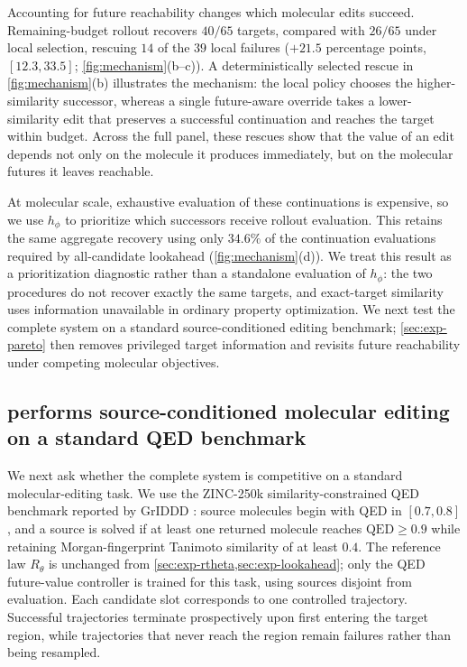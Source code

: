 Accounting for future reachability changes which molecular edits succeed. Remaining-budget rollout recovers $40/65$ targets, compared with $26/65$ under local selection, rescuing $14$ of the $39$ local failures ($+21.5$ percentage points, $[12.3,33.5]$; \cref{fig:mechanism}(b--c)). A deterministically selected rescue in \cref{fig:mechanism}(b) illustrates the mechanism: the local policy chooses the higher-similarity successor, whereas a single future-aware override takes a lower-similarity edit that preserves a successful continuation and reaches the target within budget. Across the full panel, these rescues show that the value of an edit depends not only on the molecule it produces immediately, but on the molecular futures it leaves reachable.

At molecular scale, exhaustive evaluation of these continuations is expensive, so we use $h_\phi$ to prioritize which successors receive rollout evaluation. This retains the same aggregate recovery using only $34.6\%$ of the continuation evaluations required by all-candidate lookahead (\cref{fig:mechanism}(d)). We treat this result as a prioritization diagnostic rather than a standalone evaluation of $h_\phi$: the two procedures do not recover exactly the same targets, and exact-target similarity uses information unavailable in ordinary property optimization. We next test the complete system on a standard source-conditioned editing benchmark; \cref{sec:exp-pareto} then removes privileged target information and revisits future reachability under competing molecular objectives.

\subsection{\method{} performs source-conditioned molecular editing on a standard QED benchmark}
\label{sec:exp-jin}

We next ask whether the complete \method{} system is competitive on a standard molecular-editing task. We use the ZINC-250k similarity-constrained QED benchmark reported by GrIDDD \citep{ninniri2025griddd}: source molecules begin with QED in $[0.7,0.8]$, and a source is solved if at least one returned molecule reaches $\mathrm{QED}\ge0.9$ while retaining Morgan-fingerprint Tanimoto similarity of at least $0.4$. The reference law $R_\theta$ is unchanged from \cref{sec:exp-rtheta,sec:exp-lookahead}; only the QED future-value controller is trained for this task, using sources disjoint from evaluation. Each candidate slot corresponds to one controlled trajectory. Successful trajectories terminate prospectively upon first entering the target region, while trajectories that never reach the region remain failures rather than being resampled.

